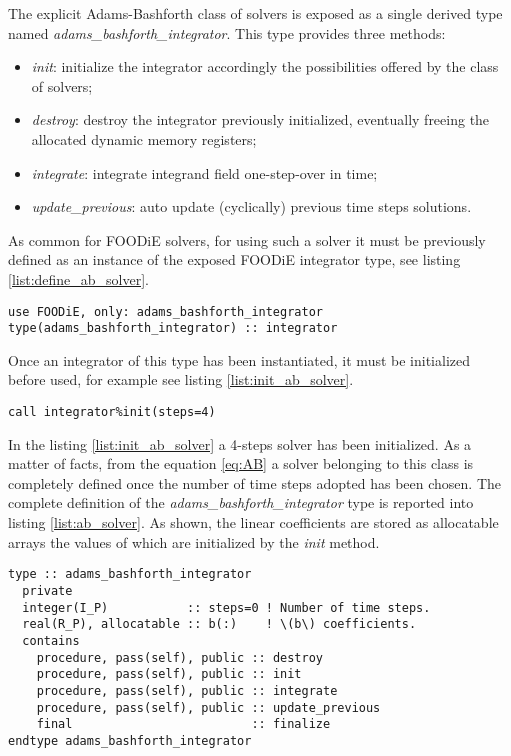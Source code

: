 The explicit Adams-Bashforth class of solvers is exposed as a single derived type named \emph{adams\_bashforth\_integrator}. This type provides three methods:

\begin{itemize}
  \item \emph{init}: initialize the integrator accordingly the possibilities offered by the class of solvers;
  \item \emph{destroy}: destroy the integrator previously initialized, eventually freeing the allocated dynamic memory registers;
  \item \emph{integrate}: integrate integrand field one-step-over in time;
  \item \emph{update\_previous}: auto update (cyclically) previous time steps solutions.
  \end{itemize}

As common for FOODiE solvers, for using such a solver it must be previously defined as an instance of the exposed FOODiE integrator type, see listing \ref{list:define_ab_solver}.

\begin{lstlisting}[firstnumber=1,style=code,caption={definition of an explicit Adams-Bashforth integrator},label={list:define_ab_solver}]
use FOODiE, only: adams_bashforth_integrator
type(adams_bashforth_integrator) :: integrator
\end{lstlisting}

Once an integrator of this type has been instantiated, it must be initialized before used, for example see listing \ref{list:init_ab_solver}.

\begin{lstlisting}[firstnumber=1,style=code,caption={example of initialization of an explicit Adams-Bashforth integrator},label={list:init_ab_solver}]
call integrator%init(steps=4)
\end{lstlisting}

In the listing \ref{list:init_ab_solver} a 4-steps solver has been initialized. As a matter of facts, from the equation \ref{eq:AB} a solver belonging to this class is completely defined once the number of time steps adopted has been chosen. The complete definition of the \emph{adams\_bashforth\_integrator} type is reported into listing \ref{list:ab_solver}. As shown, the linear coefficients are stored as allocatable arrays the values of which are initialized by the \emph{init} method.

\begin{lstlisting}[firstnumber=1,style=code,caption={definition of \emph{adams\_bashforth\_integrator} type},label={list:ab_solver}]
type :: adams_bashforth_integrator
  private
  integer(I_P)           :: steps=0 ! Number of time steps.
  real(R_P), allocatable :: b(:)    ! \(b\) coefficients.
  contains
    procedure, pass(self), public :: destroy
    procedure, pass(self), public :: init
    procedure, pass(self), public :: integrate
    procedure, pass(self), public :: update_previous
    final                         :: finalize
endtype adams_bashforth_integrator
\end{lstlisting}


